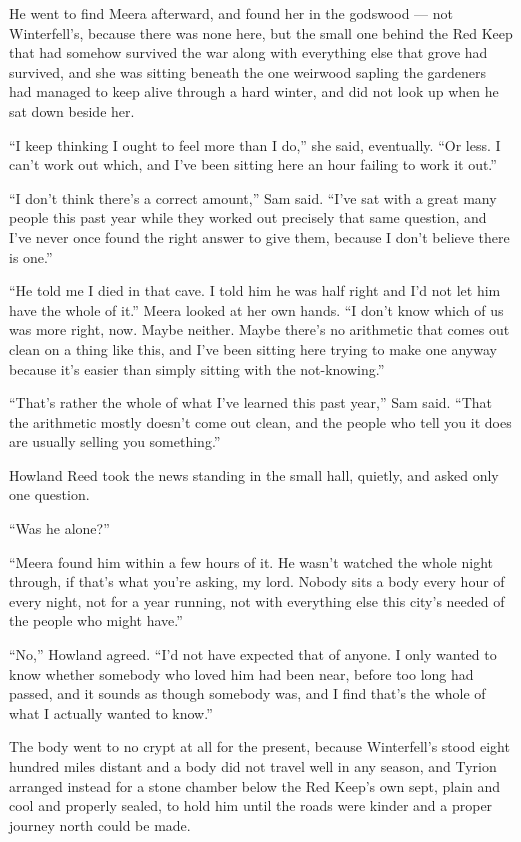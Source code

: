 \sceneBreak

He went to find Meera afterward, and found her in the godswood — not Winterfell’s, because there was none here, but the small one behind the Red Keep that had somehow survived the war along with everything else that grove had survived, and she was sitting beneath the one weirwood sapling the gardeners had managed to keep alive through a hard winter, and did not look up when he sat down beside her.

“I keep thinking I ought to feel more than I do,” she said, eventually. “Or less. I can’t work out which, and I’ve been sitting here an hour failing to work it out.”

“I don’t think there’s a correct amount,” Sam said. “I’ve sat with a great many people this past year while they worked out precisely that same question, and I’ve never once found the right answer to give them, because I don’t believe there is one.”

“He told me I died in that cave. I told him he was half right and I’d not let him have the whole of it.” Meera looked at her own hands. “I don’t know which of us was more right, now. Maybe neither. Maybe there’s no arithmetic that comes out clean on a thing like this, and I’ve been sitting here trying to make one anyway because it’s easier than simply sitting with the not-knowing.”

“That’s rather the whole of what I’ve learned this past year,” Sam said. “That the arithmetic mostly doesn’t come out clean, and the people who tell you it does are usually selling you something.”

\sceneBreak

Howland Reed took the news standing in the small hall, quietly, and asked only one question.

“Was he alone?”

“Meera found him within a few hours of it. He wasn’t watched the whole night through, if that’s what you’re asking, my lord. Nobody sits a body every hour of every night, not for a year running, not with everything else this city’s needed of the people who might have.”

“No,” Howland agreed. “I’d not have expected that of anyone. I only wanted to know whether somebody who loved him had been near, before too long had passed, and it sounds as though somebody was, and I find that’s the whole of what I actually wanted to know.”

\sceneBreak

The body went to no crypt at all for the present, because Winterfell’s stood eight hundred miles distant and a body did not travel well in any season, and Tyrion arranged instead for a stone chamber below the Red Keep’s own sept, plain and cool and properly sealed, to hold him until the roads were kinder and a proper journey north could be made.

